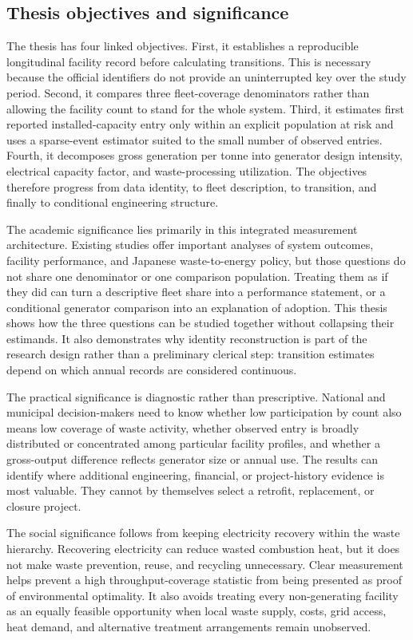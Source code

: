 \documentclass[12pt,a4paper]{article}
\begin{document}
\subsection{Thesis objectives and significance}

The thesis has four linked objectives. First, it establishes a reproducible
longitudinal facility record before calculating transitions. This is necessary
because the official identifiers do not provide an uninterrupted key over the
study period. Second, it compares three fleet-coverage denominators rather than
allowing the facility count to stand for the whole system. Third, it estimates
first reported installed-capacity entry only within an explicit population at
risk and uses a sparse-event estimator suited to the small number of observed
entries. Fourth, it decomposes gross generation per tonne into generator design
intensity, electrical capacity factor, and waste-processing utilization. The
objectives therefore progress from data identity, to fleet description, to
transition, and finally to conditional engineering structure.

The academic significance lies primarily in this integrated measurement
architecture. Existing studies offer important analyses of system outcomes,
facility performance, and Japanese waste-to-energy policy, but those questions
do not share one denominator or one comparison population. Treating them as if
they did can turn a descriptive fleet share into a performance statement, or a
conditional generator comparison into an explanation of adoption. This thesis
shows how the three questions can be studied together without collapsing their
estimands. It also demonstrates why identity reconstruction is part of the
research design rather than a preliminary clerical step: transition estimates
depend on which annual records are considered continuous.

The practical significance is diagnostic rather than prescriptive. National
and municipal decision-makers need to know whether low participation by count
also means low coverage of waste activity, whether observed entry is broadly
distributed or concentrated among particular facility profiles, and whether a
gross-output difference reflects generator size or annual use. The results can
identify where additional engineering, financial, or project-history evidence
is most valuable. They cannot by themselves select a retrofit, replacement, or
closure project.

The social significance follows from keeping electricity recovery within the
waste hierarchy. Recovering electricity can reduce wasted combustion heat, but
it does not make waste prevention, reuse, and recycling unnecessary. Clear
measurement helps prevent a high throughput-coverage statistic from being
presented as proof of environmental optimality. It also avoids treating every
non-generating facility as an equally feasible opportunity when local waste
supply, costs, grid access, heat demand, and alternative treatment arrangements
remain unobserved.
\end{document}
